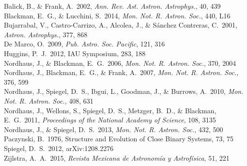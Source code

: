 \documentclass{iau_FM}
\begin{document}
\begin{thebibliography}{}

 Balick, B., \& Frank, A.\ 2002, {\it Ann. Rev. Ast. Astron. Astrophys.}, 40, 439\\

 Blackman, E.~G., \& Lucchini, S.\ 2014, {\it Mon. Not. R. Astron. Soc.}, 440, L16\\

 Bujarrabal, V., Castro-Carrizo, A., Alcolea, J., \& S{\'a}nchez Contreras, C.\ 2001, {\it Astron. Astrophys.}, 377, 868\\

 De Marco, O.\ 2009, {\it Pub. Astro. Soc. Pacific}, 121, 316\\

 Huggins, P.~J.\ 2012, IAU Symposium, 283, 188\\

 Nordhaus, J., \& Blackman, E.~G.\ 2006, {\it Mon. Not. R. Astron. Soc.}, 370, 2004\\

 Nordhaus, J., Blackman, E.~G., \& Frank, A.\ 2007, {\it Mon. Not. R. Astron. Soc.}, 376, 599\\

 Nordhaus, J., Spiegel, D.~S., Ibgui, L., Goodman, J., \& Burrows, A.\ 2010, {\it Mon. Not. R. Astron. Soc.}, 408, 631\\

 Nordhaus, J., Wellons, S., Spiegel, D.~S., Metzger, B.~D., \& Blackman, E.~G.\ 2011, {\it Proceedings of the National Academy of Science}, 108, 3135\\

 Nordhaus, J., \& Spiegel, D.~S.\ 2013, {\it Mon. Not. R. Astron. Soc.}, 432, 500\\

 Paczynski, B.\ 1976, Structure and Evolution of Close Binary Systems, 73, 75\\

 Spiegel, D.~S.\ 2012, arXiv:1208.2276 \\

 Zijlstra, A.~A.\ 2015, {\it Revista Mexicana de Astronomía y Astrofísica}, 51, 221\\

\end{thebibliography}


\end{document}
